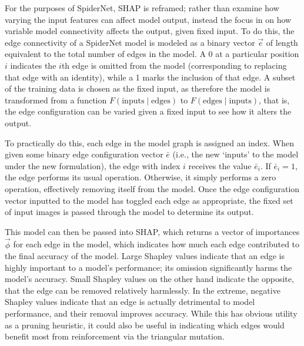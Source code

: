For the purposes of SpiderNet, SHAP is reframed; rather than examine how varying the input features can affect
model output, instead the focus in on how variable model connectivity affects the output, given fixed input. To do this, the edge
connectivity of a SpiderNet model is modeled as a binary vector $\vec{e}$ of length equivalent to the total number of edges in the
model. A 0 at a particular position $i$ indicates the $i$th edge is omitted from the model (corresponding to replacing
that edge with an identity), while a 1 marks the inclusion
of that edge. A subset of the training data is chosen as the fixed input, as therefore the model is transformed
from a function $F(\text{inputs}\;|\;\text{edges})$ to $F(\text{edges}\;|\;\text{inputs})$, that is,
the edge configuration can be varied given a fixed input to see how it alters the output.

To practically do this, each edge in the model graph is assigned an index. When given some binary edge configuration vector
$\bar{e}$ (i.e., the new `inputs' to the model under the new formulation), the edge with index $i$ receives the value $\bar{e}_i$.
If $\bar{e}_i = 1$, the edge performs its usual operation.
Otherwise, it simply performs a zero operation, effectively removing itself from the model. Once the edge configuration
vector inputted to the model has toggled each edge as appropriate, the fixed set of input images is passed through the model
to determine its output.

This model can then be passed into SHAP, which
returns a vector of importances $\vec{\phi}$ for each edge in the model, which indicates how much each edge contributed to the final accuracy
of the model. Large Shapley values indicate that an edge is highly important to a model's performance; its omission
significantly harms the model's accuracy. Small Shapley values on the other hand indicate the opposite, that the edge
can be removed relatively harmlessly. In the extreme, negative Shapley values indicate that an edge is actually detrimental
to model performance, and their removal improves accuracy. While this has obvious utility as a pruning heuristic,
it could also be useful in indicating which edges would benefit most from reinforcement via the triangular mutation.

